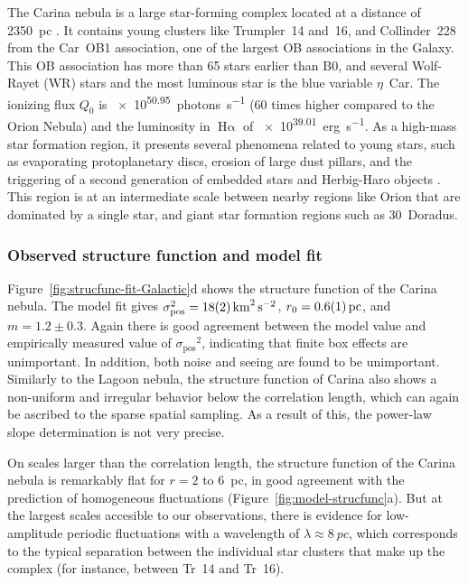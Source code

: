 \documentclass[fleqn,usenatbib, useAMS, a4paper]{mnras}
\newcommand\startNEW{\color{NEWcolor}}
\newcommand\stopNEW{\color{black}}
\newcommand\pos{\ensuremath{_{\mathrm{pos}}}}
\newcommand\ha{\ensuremath{\text{H}\upalpha}}
\begin{document}
The Carina nebula is a large star-forming complex located at a distance of \SI{2 350}{pc} \citetext{\SI{1}{\arcsecond} = \SI{0.01}{pc}; \citealp{2006ApJ...644.1151S}}.
It contains young clusters like Trumpler~14 and~16, and Collinder~228 from the Car~OB1 association, one of the largest OB associations in the Galaxy.
This OB association has more than 65 stars earlier than B0, and several Wolf-Rayet (WR) stars and the most luminous star is the blue variable $\eta$~Car.
The ionizing flux \(Q_0\) is \SI{e50.95}{photons.s^{-1}} \citep{2008hsf2.book..138S} (60 times higher compared to the Orion Nebula) and the luminosity in \ha{} of \SI{e39.01}{erg.s^{-1}}.
As a high-mass star formation region, it presents several phenomena related to young stars,
such as evaporating protoplanetary discs, erosion of large dust pillars, and the triggering of a second generation of embedded stars and Herbig-Haro objects \citetext{see \citealp{2008hsf2.book..138S} and reference therein}.
\startNEW
This region is at an intermediate scale between nearby regions like Orion
that are dominated by a single star, and giant star formation regions such as 30~Doradus.
\stopNEW

\startNEW
\subsubsection{Observed structure function and model fit}
\label{sec:observ-struct-funct-carina}
\stopNEW

Figure~\ref{fig:strucfunc-fit-Galactic}d shows the structure function of the Carina nebula.
\startNEW
The model fit gives \(\sigma\pos^2 = \SI{18 \pm 2}{km^{2}.s^{-2}}\), \(r_0 = \SI{0.6 \pm 0.1}{pc} \), and \(m = 1.2 \pm 0.3\).
Again there is good agreement between the model value and empirically measured
value of \(\sigma\pos^2\),
indicating that finite box effects are unimportant. In addition, both noise and seeing are
found to be unimportant. 
Similarly to the Lagoon nebula,
the structure function of Carina also shows a non-uniform and irregular behavior
below the correlation length, which can again be ascribed to the sparse spatial sampling.
As a result of this, the power-law slope determination is not very precise.

On scales larger than the correlation length,
the structure function of the Carina nebula is remarkably flat
for \(r = 2\) to \SI{6}{pc},
in good agreement with the prediction of homogeneous fluctuations
(Figure~\ref{fig:model-strucfunc}a).
But at the largest scales accesible to our observations, there is evidence for low-amplitude
periodic fluctuations with a wavelength of \(\lambda \approx \SI{8}{pc}\),
which corresponds to the typical separation
between the individual star clusters that make up the complex
(for instance, between Tr~14 and Tr~16).
\stopNEW
\end{document}
